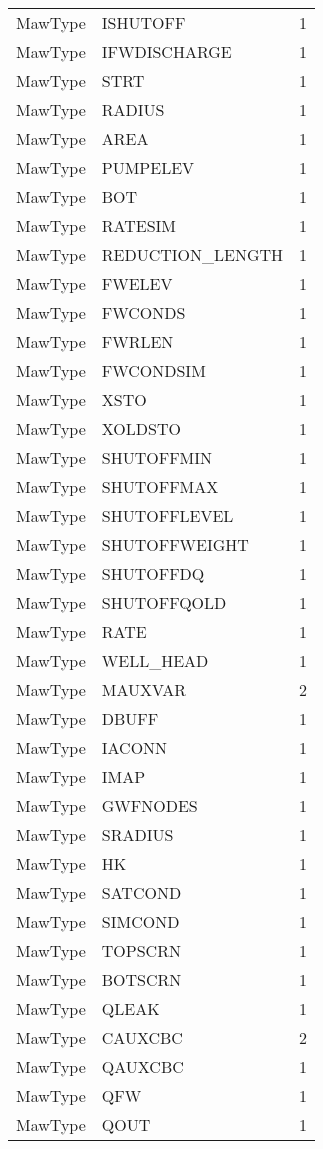\begin{longtable}{p{6cm} p{4cm} p{2cm} }
MawType &  ISHUTOFF & 1 \\ 
MawType &  IFWDISCHARGE & 1 \\ 
MawType &  STRT & 1 \\ 
MawType &  RADIUS & 1 \\ 
MawType &  AREA & 1 \\ 
MawType &  PUMPELEV & 1 \\ 
MawType &  BOT & 1 \\ 
MawType &  RATESIM & 1 \\ 
MawType &  REDUCTION\_LENGTH & 1 \\ 
MawType &  FWELEV & 1 \\ 
MawType &  FWCONDS & 1 \\ 
MawType &  FWRLEN & 1 \\ 
MawType &  FWCONDSIM & 1 \\ 
MawType &  XSTO & 1 \\ 
MawType &  XOLDSTO & 1 \\ 
MawType &  SHUTOFFMIN & 1 \\ 
MawType &  SHUTOFFMAX & 1 \\ 
MawType &  SHUTOFFLEVEL & 1 \\ 
MawType &  SHUTOFFWEIGHT & 1 \\ 
MawType &  SHUTOFFDQ & 1 \\ 
MawType &  SHUTOFFQOLD & 1 \\ 
MawType &  RATE & 1 \\ 
MawType &  WELL\_HEAD & 1 \\ 
MawType &  MAUXVAR & 2 \\ 
MawType &  DBUFF & 1 \\ 
MawType &  IACONN & 1 \\ 
MawType &  IMAP & 1 \\ 
MawType &  GWFNODES & 1 \\ 
MawType &  SRADIUS & 1 \\ 
MawType &  HK & 1 \\ 
MawType &  SATCOND & 1 \\ 
MawType &  SIMCOND & 1 \\ 
MawType &  TOPSCRN & 1 \\ 
MawType &  BOTSCRN & 1 \\ 
MawType &  QLEAK & 1 \\ 
MawType &  CAUXCBC & 2 \\ 
MawType &  QAUXCBC & 1 \\ 
MawType &  QFW & 1 \\ 
MawType &  QOUT & 1 \\ 

\end{longtable}
